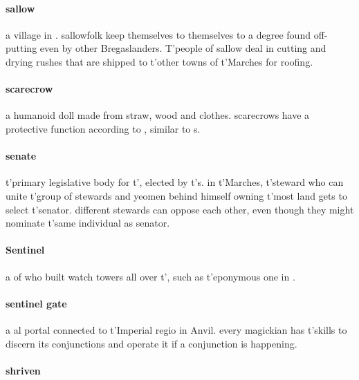 \paragraph{sallow} a village in . sallowfolk keep themselves to themselves to a degree found off-putting even by other Bregaslanders. T'people of sallow deal in cutting and drying rushes that are shipped to t'\allowbreak other towns of t'\allowbreak Marches for roofing. 
\paragraph{scarecrow} a humanoid doll made from straw, wood and clothes. scarecrows have a protective function according to , similar to s.
\paragraph{senate} t'\allowbreak primary legislative body for t'\allowbreak {}, elected by t'\allowbreak {}s. in t'\allowbreak Marches, t'\allowbreak steward who can unite t'\allowbreak group of stewards and yeomen behind himself owning t'\allowbreak most land gets to select t'\allowbreak senator. different stewards can oppose each other, even though they might nominate t'\allowbreak same individual as senator.
\paragraph{Sentinel} a  of  who built watch towers all over t'\allowbreak {}, such as t'\allowbreak eponymous one in . 
\paragraph{sentinel gate} a al portal connected to t'\allowbreak Imperial regio in Anvil. every magickian has t'\allowbreak skills to discern its conjunctions and operate it if a conjunction is happening.
\paragraph{shriven}
